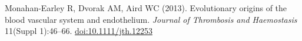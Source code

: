 \item Monahan-Earley R, Dvorak AM, Aird WC (2013). Evolutionary origins of the blood vascular system and endothelium. \emph{Journal of Thrombosis and Haemostasis} 11(Suppl 1):46–66. \href{https://doi.org/10.1111/jth.12253}{doi:10.1111/jth.12253}
